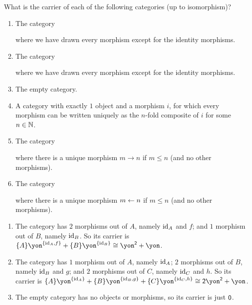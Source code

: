 \documentclass[Book-Poly]{subfiles}
\begin{document}
\begin{exercise} \label{exc.ema_polys}
What is the carrier of each of the following categories (up to isomorphism)?
\begin{enumerate}
	\item The category
	\begin{center}
	\end{center}
	where we have drawn every morphism except for the identity morphisms.
	\item The category
	\begin{center}
	\end{center}
	where we have drawn every morphism except for the identity morphisms.
	\item The empty category.
	\item \label{exc.ema_polys.nat_monoid} A category with exactly $1$ object and a morphism $i$, for which every morphism can be written uniquely as the $n$-fold composite of $i$ for some $n\in\mathbb{N}$.
	\item \label{exc.ema_polys.nat_poset} The category
	\begin{center}
	\end{center}
	where there is a unique morphism $m\to n$ if $m\leq n$ (and no other morphisms).
	\item The category
	\begin{center}
	\end{center}
	where there is a unique morphism $m\leftarrow n$ if $m\leq n$ (and no other morphisms).\qedhere
\end{enumerate}
\begin{solution}
\begin{enumerate}
	\item The category  has $2$ morphisms out of $A$, namely $\mathrm{id}_A$ and $f$; and $1$ morphism out of $B$, namely $\mathrm{id}_B$.
	So its carrier is $\{A\}\yon^{\{\id_A,f\}}+\{B\}\yon^{\{\id_B\}}\iso\yon^\2+\yon$.
	\item The category  has $1$ morphism out of $A$, namely $\mathrm{id}_A$; $2$ morphisms out of $B$, namely $\mathrm{id}_B$ and $g$; and $2$ morphisms out of $C$, namely $\mathrm{id}_C$ and $h$.
	So its carrier is $\{A\}\yon^{\{\id_A\}}+\{B\}\yon^{\{\id_B,g\}}+\{C\}\yon^{\{\id_C,h\}}\iso\2\yon^\2+\yon$.
	\item The empty category has no objects or morphisms, so its carrier is just $\textsf{0}$.

\end{enumerate}
\end{solution}
\end{exercise}
\end{document}
